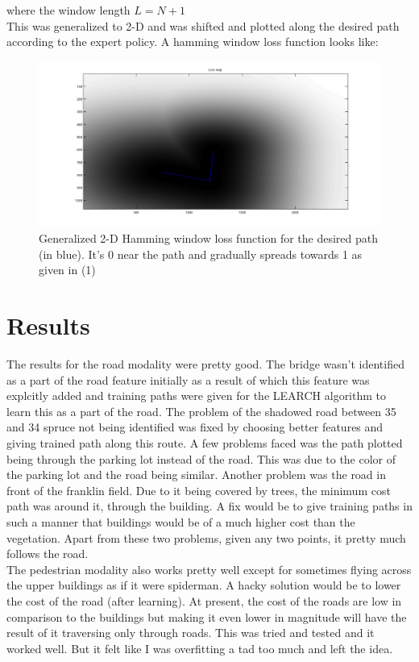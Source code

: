 \documentclass[english]{article}
\begin{document}
where the window length $L = N + 1$ \\
This was generalized to 2-D and was shifted and plotted along the desired path according to the expert policy. A hamming window loss function looks like:

\begin{figure}[thpb]
\centering
\includegraphics[width=\textwidth]{lossMap}
\caption{Generalized 2-D Hamming window loss function for the desired path (in blue). It's 0 near the path and gradually spreads towards 1 as given in (1)}
\end{figure}

\section{Results}
The results for the road modality were pretty good. The bridge wasn't identified as a part of the road feature initially as a result of which this feature was explcitly added and training paths were given for the LEARCH algorithm to learn this as a part of the road. The problem of the shadowed road between 35 and 34 spruce not being identified  was fixed by choosing better features and giving trained path along this route. A few problems faced was the path plotted being through the parking lot instead of the road. This was due to the color of the parking lot and the road being similar. Another problem was the road in front of the franklin field. Due to it being covered by trees, the minimum cost path was around it, through the building. A fix would be to give training paths in such a manner that buildings would be of a much higher cost than the vegetation. Apart from these two problems, given any two points, it pretty much follows the road. \\
The pedestrian modality also works pretty well except for sometimes flying across the upper buildings as if it were spiderman. A hacky solution would be to lower the cost of the road (after learning). At present, the cost of the roads are low in comparison to the buildings but making it even lower in magnitude will have the result of it traversing only through roads. This was tried and tested and it worked well. But it felt like I was overfitting a tad too much and left the idea. \\
\end{document}
